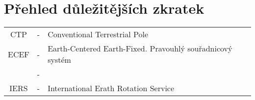 \section*{Přehled důležitějších zkratek}

\begin{table}[ht!]
  \begin{tabular}{c c l}
    CTP  & - & Conventional Terrestrial Pole  \\
    ECEF & - & Earth-Centered Earth-Fixed. Pravouhlý souřadnicový systém \\
  & - & \\   
    IERS & - & International Erath Rotation Service \\
  \end{tabular}
\end{table}